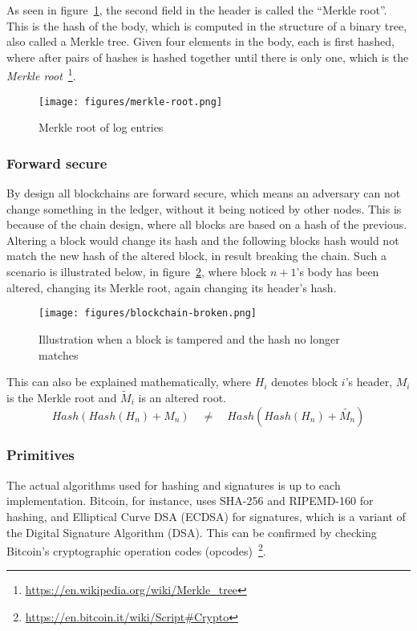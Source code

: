 As seen in figure~\ref{fig:merkle-root}, the second field in the
header is called the ``Merkle root''. This is the hash of the body,
which is computed in the structure of a binary tree, also called a
Merkle tree. Given four elements in the body, each is first hashed,
where after pairs of hashes is hashed together until there is only
one, which is the \textit{Merkle
  root}~\footnote{\url{https://en.wikipedia.org/wiki/Merkle_tree}}.
\begin{figure}[H]
  \centering
  \texttt{[image: figures/merkle-root.png]}
  \caption{\label{fig:merkle-root} Merkle root of log entries}
\end{figure}

\subsubsection{Forward secure}
By design all blockchains are forward secure, which means an adversary
can not change something in the ledger, without it being noticed by
other nodes. This is because of the chain design, where all blocks are
based on a hash of the previous. Altering a block would change its
hash and the following blocks hash would not match the new hash of the
altered block, in result breaking the chain. Such a scenario is
illustrated below, in figure~\ref{fig:blockchain-broken}, where block
$n+1$'s body has been altered, changing its Merkle root, again
changing its header's hash.
\begin{figure}[ht]
  \centering
  \texttt{[image: figures/blockchain-broken.png]}
  \caption{\label{fig:blockchain-broken} Illustration when a block is
    tampered and the hash no longer matches}
\end{figure}

This can also be explained mathematically, where $H_i$ denotes block
$i$'s header, $M_i$ is the Merkle root and $\widetilde{M}_i$
is an altered root.
\begin{equation}
Hash(Hash(H_n) + M_n) \quad\neq\quad Hash(Hash(H_n) + \widetilde{M_n})
\end{equation}

\subsubsection{Primitives}
The actual algorithms used for hashing and signatures is up to each
implementation. Bitcoin, for instance, uses SHA-256 and RIPEMD-160 for
hashing, and Elliptical Curve DSA (ECDSA) for signatures, which is a
variant of the Digital Signature Algorithm (DSA). This can be
confirmed by checking Bitcoin's cryptographic operation codes
(opcodes)~\footnote{\url{https://en.bitcoin.it/wiki/Script\#Crypto}}.

